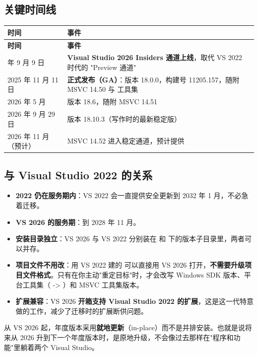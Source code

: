 \subsection{关键时间线}
\begin{longtable}{L{3.4cm}L{11.6cm}}
\toprule
\textbf{时间} & \textbf{事件} \\
\midrule
\endfirsthead
\toprule
\textbf{时间} & \textbf{事件} \\
\midrule
\endhead
\bottomrule
{} 年 9 月 9 日 & \textbf{Visual Studio 2026 Insiders 通道上线}，取代 VS 2022 时代的 "Preview 通道" \\
2025 年 11 月 11 日 & \textbf{正式发布（GA）}：版本 18.0.0，构建号 11205.157，随附 MSVC 14.50 与  工具集 \\
2026 年 5 月 & 版本 18.6，随附 MSVC 14.51 \\
2026 年 9 月 29 日 & 版本 18.10.3（写作时的最新稳定版） \\
2026 年 11 月（预计） & MSVC 14.52 进入稳定通道，预计提供  \\
\end{longtable}

\subsection{与 Visual Studio 2022 的关系}
\begin{itemize}
  \item \textbf{2022 仍在服务期内}：VS 2022 会一直提供安全更新到 2032 年 1 月，不必急着迁移。
  \item \textbf{VS 2026 的服务期}：到 2028 年 11 月。
  \item \textbf{安装目录独立}：VS 2026 与 VS 2022 分别装在  和  下的版本子目录里，两者可以并存。
  \item \textbf{项目文件不用改}：用 VS 2022 建的  可以直接用 VS 2026 打开，\textbf{不需要升级项目文件格式}。只有在你主动"重定目标"时，才会改写 Windows SDK 版本、平台工具集（ -> ）和 MSVC 工具集版本。
  \item \textbf{扩展兼容}：VS 2026 \textbf{开箱支持 Visual Studio 2022 的扩展}，这是这一代特意做的工作，减少了迁移时的扩展断供问题。
\end{itemize}

\begin{warnbox}[注意]
从 VS 2026 起，年度版本采用\textbf{就地更新}（in-place）而不是并排安装。也就是说将来从 2026 升到下一个年度版本时，是原地升级，不会像过去那样在"程序和功能"里躺着两个 Visual Studio。
\end{warnbox}

